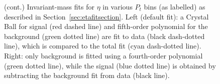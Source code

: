 \begin{figure}[H]
\caption[Invariant-mass fits for $\eta$ in various \(P_{t}\) bins (cont.)]{(cont.) Invariant-mass fits for $\eta$ in various \(P_{t}\) bins (as labelled) as described in Section~\ref{sec:etafitsection}. Left (default fit):  a Crystal Ball for signal (red dashed line) and fifth-order polynomial for the background (green dotted line) are fit to data (black dash-dotted line), which is compared to the total fit  (cyan dash-dotted line). Right: only background is fitted using a fourth-order polynomial (green dotted line), while the signal (blue dotted line) is obtained by subtracting the background fit from data (black line).}
  \label{fig:etaptfit}
\end{figure}
